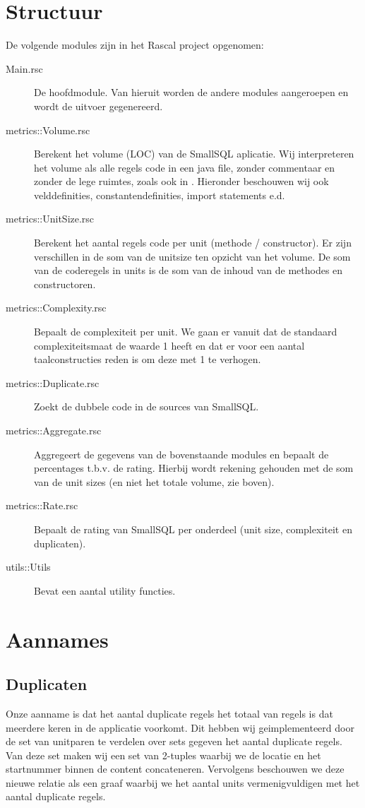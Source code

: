 \documentclass[a4paper]{article}
\begin{document}
\section{Structuur}
\label{sec:Structuur}
De volgende modules zijn in het Rascal project opgenomen:
\begin{description}
\item[Main.rsc] De hoofdmodule. Van hieruit worden de andere modules aangeroepen en wordt de uitvoer gegenereerd.
\item[metrics::Volume.rsc] Berekent het volume (LOC) van de SmallSQL aplicatie. Wij interpreteren het volume als alle regels code in een java file, zonder commentaar en zonder de lege ruimtes, zoals ook in \cite{A}. Hieronder beschouwen wij ook velddefinities, constantendefinities, import statements e.d.
\item[metrics::UnitSize.rsc] Berekent het aantal regels code per unit (methode / constructor). Er zijn verschillen in de som van de unitsize ten opzicht van het volume. De som van de coderegels in units is de som van de inhoud van de methodes en constructoren.
\item[metrics::Complexity.rsc] Bepaalt de complexiteit per unit. We gaan er vanuit dat de standaard complexiteitsmaat de waarde 1 heeft en dat er voor een aantal taalconstructies reden is om deze met 1 te verhogen.
\item[metrics::Duplicate.rsc] Zoekt de dubbele code in de sources van SmallSQL.
\item[metrics::Aggregate.rsc] Aggregeert de gegevens van de bovenstaande modules en bepaalt de percentages t.b.v. de rating. Hierbij wordt rekening gehouden met de som van de unit sizes (en niet het totale volume, zie boven).
\item[metrics::Rate.rsc] Bepaalt de rating van SmallSQL per onderdeel (unit size, complexiteit en duplicaten).
\item[utils::Utils] Bevat een aantal utility functies.
\end{description}
\section{Aannames}
\subsection{Duplicaten}
Onze aanname is dat het aantal duplicate regels het totaal van regels is dat meerdere keren in de applicatie voorkomt. Dit hebben wij geimplementeerd door de set van unitparen te verdelen over sets gegeven het aantal duplicate regels. Van deze set maken wij een set van 2-tuples waarbij we de locatie en het startnummer binnen de content concateneren. Vervolgens beschouwen we deze nieuwe relatie als een graaf waarbij we het aantal units vermenigvuldigen met het aantal duplicate regels.
\end{document}
